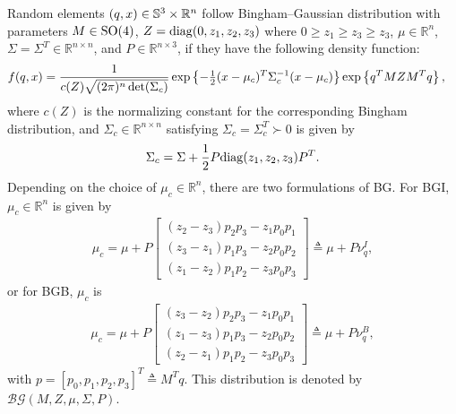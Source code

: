 \begin{definition}
	Random elements $(q,x)\in\mathbb{S}^3\times\mathbb{R}^n$ follow Bingham--Gaussian distribution with parameters $M\in\mathrm{SO}(4)$, $Z = \mathrm{diag}(0,z_1,z_2,z_3)$ where $0\geq z_1 \geq z_3 \geq z_3$, $\mu\in\mathbb{R}^n$, $\Sigma=\Sigma^T\in\mathbb{R}^{n\times n}$, and $P\in\mathbb{R}^{n\times 3}$, if they have the following density function:
	\begin{align} \label{eqn:BG-density}
		&f(q,x) = \frac{1}{c(Z)\sqrt{(2\pi)^n\det(\Sigma_c)}} \exp\left\{  -\tfrac{1}{2}(x-\mu_c)^T \Sigma_c^{-1} (x-\mu_c)  \right\} \exp\left\{ q^TMZM^Tq \right\} ,
	\end{align}
	where $c(Z)$ is the normalizing constant for the corresponding Bingham distribution, and $\Sigma_c\in\mathbb{R}^{n\times n}$ satisfying $\Sigma_c = \Sigma_c^T \succ 0$ is given by
	\begin{align}
		\Sigma_c = \Sigma + \frac{1}{2}P\mathrm{diag}(z_1,z_2,z_3)P^T.
	\end{align}
	Depending on the choice of $\mu_c\in\mathbb{R}^n$, there are two formulations of BG. 
	For BGI, $\mu_c\in\mathbb{R}^n$ is given by
	\begin{align} \label{eqn:BG-vq-BGI}
		\mu_c = \mu + P\begin{bmatrix} (z_2-z_3)p_2p_3 - z_1p_0p_1 \\ (z_3-z_1)p_1p_3 - z_2p_0p_2 \\ (z_1-z_2)p_1p_2 - z_3p_0p_3 \end{bmatrix} \triangleq \mu + P\nu_q^I,
	\end{align}
	or for BGB, $\mu_c$ is
	\begin{align} \label{eqn:BG-vq-BGB}
		\mu_c = \mu + P\begin{bmatrix} (z_3-z_2)p_2p_3 - z_1p_0p_1 \\ (z_1-z_3)p_1p_3 - z_2p_0p_2 \\ (z_2-z_1)p_1p_2 - z_3p_0p_3 \end{bmatrix} \triangleq \mu + P\nu_q^B,
	\end{align}
	with $p = [p_0, p_1, p_2, p_3]^T \triangleq M^Tq$.
	This distribution is denoted by $\mathcal{BG}(M,Z,\mu,\Sigma,P)$.
\end{definition}

